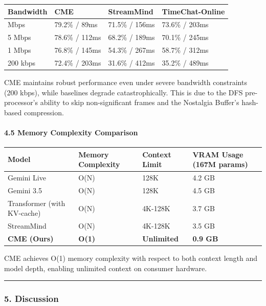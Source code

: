 \documentclass[
  11pt,
  a4paper,
]{article}
\begin{document}
\begin{longtable}[]{@{}llll@{}}
\toprule\noalign{}
Bandwidth & CME & StreamMind & TimeChat-Online \\
\midrule\noalign{}
\endhead
\bottomrule\noalign{}
\endlastfoot
10 Mbps & 79.2\% / 89ms & 71.5\% / 156ms & 73.6\% / 203ms \\
5 Mbps & 78.6\% / 112ms & 68.2\% / 189ms & 70.1\% / 245ms \\
1 Mbps & 76.8\% / 145ms & 54.3\% / 267ms & 58.7\% / 312ms \\
200 kbps & 72.4\% / 203ms & 31.6\% / 412ms & 35.2\% / 489ms \\
\end{longtable}

CME maintains robust performance even under severe bandwidth constraints
(200 kbps), while baselines degrade catastrophically. This is due to the
DFS pre-processor's ability to skip non-significant frames and the
Nostalgia Buffer's hash-based compression.

\paragraph{4.5 Memory Complexity
Comparison}\label{memory-complexity-comparison}

\begin{longtable}[]{@{}llll@{}}
\toprule\noalign{}
Model & Memory Complexity & Context Limit & VRAM Usage (167M params) \\
\midrule\noalign{}
\endhead
\bottomrule\noalign{}
\endlastfoot
Gemini Live & O(N) & 128K & 4.2 GB \\
Gemini 3.5 & O(N) & 128K & 4.5 GB \\
Transformer (with KV-cache) & O(N) & 4K-128K & 3.7 GB \\
StreamMind & O(N) & 4K-128K & 3.5 GB \\
\textbf{CME (Ours)} & \textbf{O(1)} & \textbf{Unlimited} & \textbf{0.9
GB} \\
\end{longtable}

CME achieves O(1) memory complexity with respect to both context length
and model depth, enabling unlimited context on consumer hardware.

\begin{center}\rule{0.5\linewidth}{0.5pt}\end{center}

\subsubsection{5. Discussion}\label{discussion-1}
\end{document}
